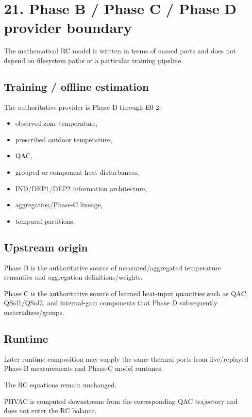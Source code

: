 \documentclass[11pt]{article}
\begin{document}
\section*{21. Phase B / Phase C / Phase D provider boundary}

The mathematical RC model is written in terms of named ports and does not
depend on filesystem paths or a particular training pipeline.

\subsection*{Training / offline estimation}

The authoritative provider is Phase D through E0-2:
\begin{itemize}
    \item observed zone temperature,
    \item prescribed outdoor temperature,
    \item QAC,
    \item grouped or component heat disturbances,
    \item IND/DEP1/DEP2 information architecture,
    \item aggregation/Phase-C lineage,
    \item temporal partitions.
\end{itemize}

\subsection*{Upstream origin}

Phase B is the authoritative source of measured/aggregated temperature
semantics and aggregation definitions/weights.

Phase C is the authoritative source of learned heat-input quantities such as
QAC, QSol1/QSol2, and internal-gain components that Phase D subsequently
materializes/groups.

\subsection*{Runtime}

Later runtime composition may supply the same thermal ports from live/replayed
Phase-B measurements and Phase-C model runtimes.

The RC equations remain unchanged.

PHVAC is computed downstream from the corresponding QAC trajectory and does
not enter the RC balance.
\end{document}
